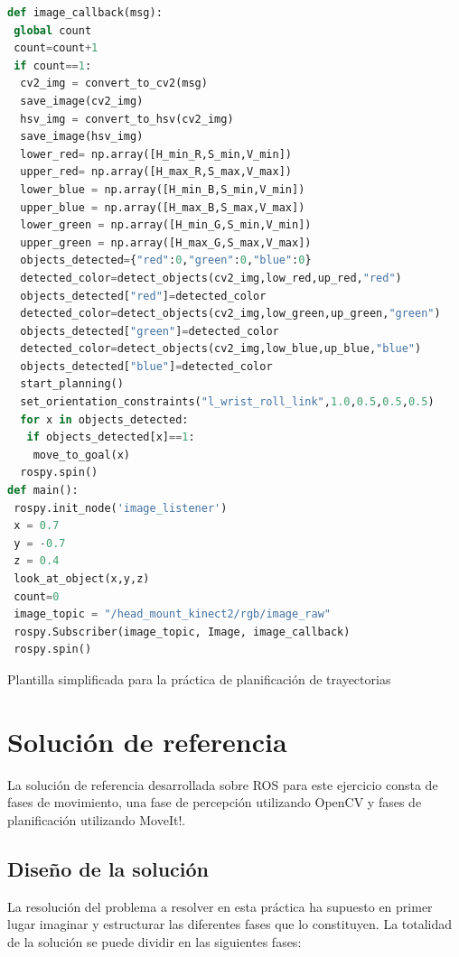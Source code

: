 \documentclass[12pt,spanish,chapterprefix, numbers=noenddot]{book}
\numberwithin{equation}{section}
\numberwithin{figure}{section}
\begin{document}
\begin{algorithm}[htb!]
	\begin{lstlisting}[breaklines=true,language=python]    
def image_callback(msg):
 global count
 count=count+1
 if count==1:
  cv2_img = convert_to_cv2(msg)
  save_image(cv2_img)
  hsv_img = convert_to_hsv(cv2_img)
  save_image(hsv_img)
  lower_red= np.array([H_min_R,S_min,V_min])
  upper_red= np.array([H_max_R,S_max,V_max])
  lower_blue = np.array([H_min_B,S_min,V_min])
  upper_blue = np.array([H_max_B,S_max,V_max])
  lower_green = np.array([H_min_G,S_min,V_min])
  upper_green = np.array([H_max_G,S_max,V_max])
  objects_detected={"red":0,"green":0,"blue":0}
  detected_color=detect_objects(cv2_img,low_red,up_red,"red")
  objects_detected["red"]=detected_color
  detected_color=detect_objects(cv2_img,low_green,up_green,"green")
  objects_detected["green"]=detected_color
  detected_color=detect_objects(cv2_img,low_blue,up_blue,"blue")
  objects_detected["blue"]=detected_color
  start_planning()
  set_orientation_constraints("l_wrist_roll_link",1.0,0.5,0.5,0.5)
  for x in objects_detected:
   if objects_detected[x]==1:
    move_to_goal(x)
  rospy.spin()
def main():
 rospy.init_node('image_listener')
 x = 0.7
 y = -0.7
 z = 0.4
 look_at_object(x,y,z)
 count=0
 image_topic = "/head_mount_kinect2/rgb/image_raw"
 rospy.Subscriber(image_topic, Image, image_callback)
 rospy.spin()
	\end{lstlisting}
\caption{\label{alg:template-py}Plantilla simplificada para la práctica de planificación de trayectorias}
\end{algorithm}

\chapter{Solución de referencia}\label{sec:solución}
La solución de referencia desarrollada sobre ROS para este ejercicio consta de fases de movimiento, una fase de percepción utilizando OpenCV y fases de planificación utilizando MoveIt!.  

\section{Diseño de la solución}

La resolución del problema a resolver en esta práctica ha supuesto en primer lugar imaginar y estructurar las diferentes fases que lo constituyen. La totalidad de la solución se puede dividir en las siguientes fases: 
\end{document}
